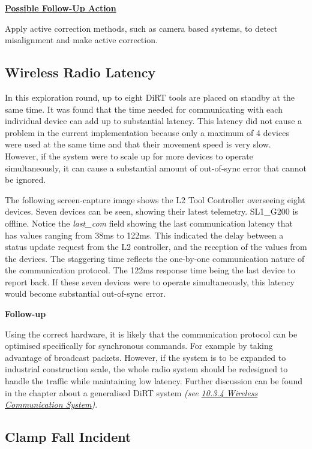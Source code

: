 


\textbf{\ul{Possible Follow-Up Action}}

Apply active correction methods, such as camera based systems, to detect misalignment and make active correction.

\subsection{Wireless Radio Latency}
\label{subsection:exploration-5-wireless-radio-latency}

In this exploration round, up to eight DiRT tools are placed on standby at the same time. It was found that the time needed for communicating with each individual device can add up to substantial latency. This latency did not cause a problem in the current implementation because only a maximum of 4 devices were used at the same time and that their movement speed is very slow. However, if the system were to scale up for more devices to operate simultaneously, it can cause a substantial amount of out-of-sync error that cannot be ignored.

The following screen-capture image shows the L2 Tool Controller overseeing eight devices. Seven devices can be seen, showing their latest telemetry. SL1\_G200 is offline. Notice the \textit{last\_com }field showing the last communication latency that has values ranging from 38ms to 122ms. This indicated the delay between a status update request from the L2 controller, and the reception of the values from the devices. The staggering time reflects the one-by-one communication nature of the communication protocol. The 122ms response time being the last device to report back. If these seven devices were to operate simultaneously, this latency would become substantial out-of-sync error. 




\textbf{Follow-up}

Using the correct hardware, it is likely that the communication protocol can be optimised specifically for synchronous commands. For example by taking advantage of broadcast packets. However, if the system is to be expanded to industrial construction scale, the whole radio system should be redesigned to handle the traffic while maintaining low latency. Further discussion can be found in the chapter about a generalised DiRT system \textit{(see \ul{10.3.4 Wireless Communication System})}. 

\subsection{Clamp Fall Incident}
\label{subsection:exploration-5-clamp-fall-incident}

